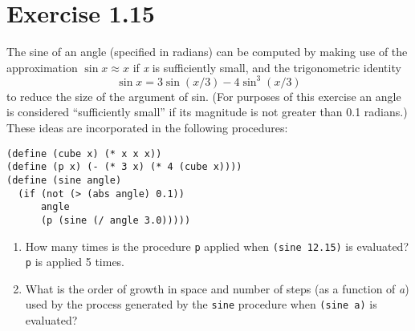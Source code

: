 \documentclass[11pt]{article}
\begin{document}
\section{Exercise 1.15}
\label{sec:orgbe089cd}
The sine of an angle (specified in radians) can be computed by making use of
the approximation \(\sin x \approx x\) if \emph{x} is sufficiently small, and the
trigonometric identity
\begin{equation}
\sin x = 3 \sin (x/3) - 4 \sin^3 (x/3)
\end{equation}
to reduce the size of the argument of sin. (For purposes of this exercise an
angle is considered ``sufficiently small'' if its magnitude is not greater
than 0.1 radians.) These ideas are incorporated in the following procedures:
\begin{verbatim}
(define (cube x) (* x x x))
(define (p x) (- (* 3 x) (* 4 (cube x))))
(define (sine angle)
  (if (not (> (abs angle) 0.1))
      angle
      (p (sine (/ angle 3.0)))))
\end{verbatim}
\begin{enumerate}
\item How many times is the procedure \texttt{p} applied when \texttt{(sine 12.15)} is
evaluated?
\texttt{p} is applied 5 times.
\item What is the order of growth in space and number of steps (as a function of
\emph{a}) used by the process generated by the \texttt{sine} procedure when \texttt{(sine a)}
is evaluated?
\end{enumerate}
\end{document}
